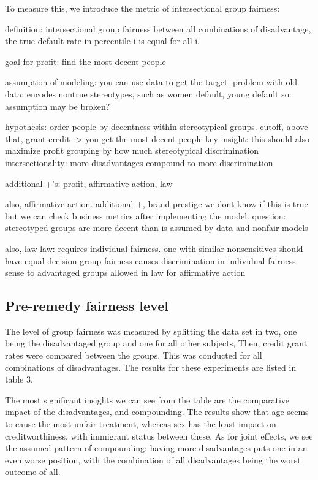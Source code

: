 \documentclass{article}
\begin{document}
To measure this, we introduce the metric of intersectional group fairness:

definition: intersectional group fairness 
between all combinations of disadvantage, the true default rate in percentile i is equal for all i.

goal for profit: find the most decent people

assumption of modeling: you can use data to get the target.
    problem with old data: encodes nontrue stereotypes, such as women default, young default 
    so: assumption may be broken?

hypothesis: order people by decentness within stereotypical groups.
cutoff, above that, grant credit -> you get the most decent people 
    key insight: this should also maximize profit
grouping by how much stereotypical discrimination
    intersectionality: more disadvantages compound to more discrimination    

additional +'s: profit, affirmative action, law

also, affirmative action. additional +, brand prestige
we dont know if this is true but we can check business metrics after implementing 
    the model.
question: stereotyped groups are more decent than is assumed by data and nonfair models

also, law
law: requires individual fairness. one with similar nonsensitives should 
    have equal decision 
group fairness causes discrimination in individual fairness sense to advantaged groups 
    allowed in law for affirmative action 

\subsection*{Pre-remedy fairness level}

The level of group fairness was measured by splitting the data set in two, 
one being the disadvantaged group and one for all other subjects, Then, 
credit grant rates were compared between the groups. This was conducted for all 
combinations of disadvantages. The results for these experiments are listed in table 3. \cite{stanley}

The most significant insights we can see from the table are the comparative 
impact of the disadvantages, and compounding. The results show that age seems 
to cause the most unfair treatment, whereas sex has the least impact on creditworthiness,
with immigrant status between these. As for joint effects, we see the assumed pattern of compounding: 
having more disadvantages puts one in an even worse position, with the combination
of all disadvantages being the worst outcome of all.
\end{document}
